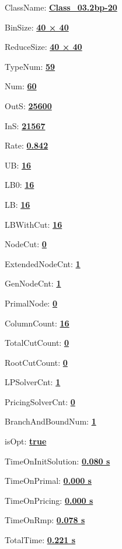 \documentclass[11pt]{article}
\begin{document}
\pagestyle{empty}


ClassName: \underline{\textbf{Class_03.2bp-20}}
\par
BinSize: \underline{\textbf{40 × 40}}
\par
ReduceSize: \underline{\textbf{40 × 40}}
\par
TypeNum: \underline{\textbf{59}}
\par
Num: \underline{\textbf{60}}
\par
OutS: \underline{\textbf{25600}}
\par
InS: \underline{\textbf{21567}}
\par
Rate: \underline{\textbf{0.842}}
\par
UB: \underline{\textbf{16}}
\par
LB0: \underline{\textbf{16}}
\par
LB: \underline{\textbf{16}}
\par
LBWithCut: \underline{\textbf{16}}
\par
NodeCut: \underline{\textbf{0}}
\par
ExtendedNodeCnt: \underline{\textbf{1}}
\par
GenNodeCnt: \underline{\textbf{1}}
\par
PrimalNode: \underline{\textbf{0}}
\par
ColumnCount: \underline{\textbf{16}}
\par
TotalCutCount: \underline{\textbf{0}}
\par
RootCutCount: \underline{\textbf{0}}
\par
LPSolverCnt: \underline{\textbf{1}}
\par
PricingSolverCnt: \underline{\textbf{0}}
\par
BranchAndBoundNum: \underline{\textbf{1}}
\par
isOpt: \underline{\textbf{true}}
\par
TimeOnInitSolution: \underline{\textbf{0.080 s}}
\par
TimeOnPrimal: \underline{\textbf{0.000 s}}
\par
TimeOnPricing: \underline{\textbf{0.000 s}}
\par
TimeOnRmp: \underline{\textbf{0.078 s}}
\par
TotalTime: \underline{\textbf{0.221 s}}
\par
\newpage


\end{document}
